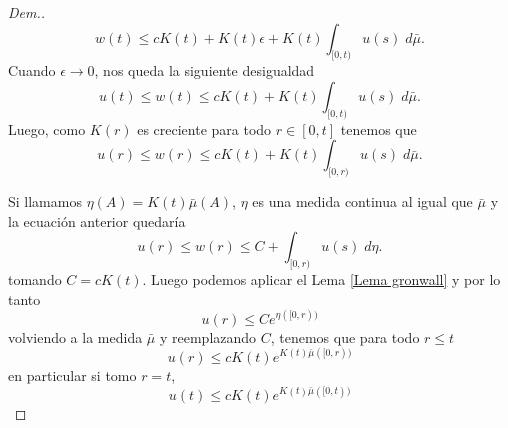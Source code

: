 \begin{proof}[Dem.]
\begin{equation*}
	w(t)\leq cK(t)+ K(t)\epsilon+K(t)\int_{[0,t)}u(s)\;d\bar{\mu}.
\end{equation*}
Cuando $\epsilon\to 0$, nos queda la siguiente desigualdad
\begin{equation*}
	u(t)\leq w(t)\leq cK(t)+K(t)\int_{[0,t)}u(s)\; d\bar{\mu}.
\end{equation*}
Luego, como $K(r)$ es creciente para todo $r\in[0,t]$ tenemos que 
\begin{equation*}
	u(r)\leq w(r)\leq cK(t)+K(t)\int_{[0,r)}u(s)\;d\bar{\mu}. 
\end{equation*}

Si llamamos $\eta(A)=K(t)\bar{\mu}(A)$,   $\eta$ es una medida continua al igual que $\bar{\mu}$ y la ecuación anterior quedaría
\begin{equation*}\label{eq:T4}
	u(r)\leq w(r)\leq C+\int_{[0,r)}u(s)\;d\eta. 
\end{equation*}
tomando $C=cK(t)$. 
Luego podemos aplicar el Lema \ref{Lema gronwall} y por lo tanto 
$$u(r)\leq Ce^{\eta([0,r))}$$
volviendo a la medida $\bar{\mu}$ y reemplazando $C$, tenemos que para todo $r\leq t$
\begin{equation*}
u(r)\leq cK(t) e^{K(t)\bar{\mu}([0,r))}
\end{equation*}
en particular si tomo $r=t$,
\begin{equation*}
u(t)\leq cK(t) e^{K(t)\bar{\mu}([0,t))}
\end{equation*}
\end{proof}














 	
 	
